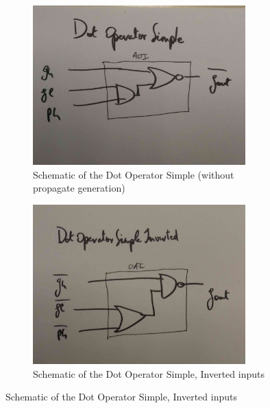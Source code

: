 \documentclass[english]{article}
\begin{document}
\begin{figure}[h!]
\centering
\begin{subfigure}{.5\textwidth}
  \centering
  \includegraphics[width=0.9\textwidth]{figures/dos}
\caption{Schematic of the Dot Operator Simple (without propagate generation)}
\label{DOS}
\end{subfigure}%
\begin{subfigure}{.5\textwidth}
  \centering
\includegraphics[width=0.9\textwidth]{figures/dosi}
\caption{Schematic of the Dot Operator Simple, Inverted inputs}
\label{DOI}
\end{subfigure}
\end{figure}
\end{document}
